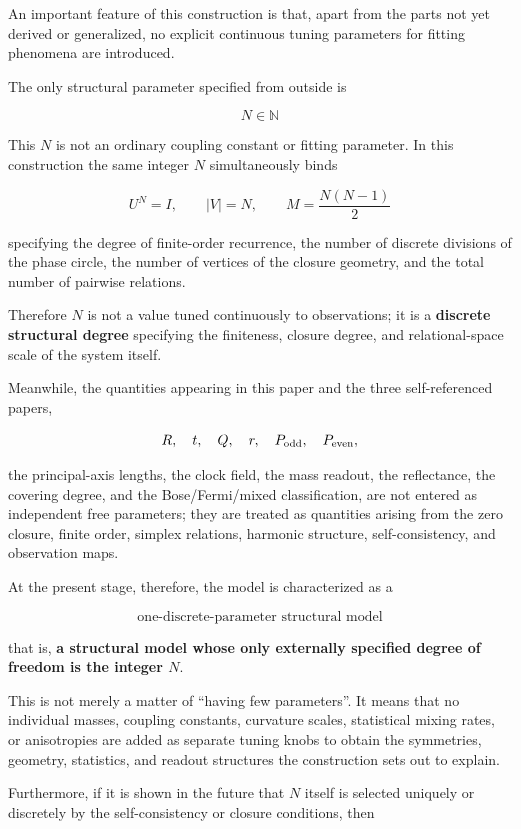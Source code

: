 \documentclass[
  a4paper,
]{article}
\begin{document}
An important feature of this construction is that, apart from the parts
not yet derived or generalized, no explicit continuous tuning parameters
for fitting phenomena are introduced.

The only structural parameter specified from outside is

\[
\boxed{N\in\mathbb N}
\]

This \(N\) is not an ordinary coupling constant or fitting parameter. In
this construction the same integer \(N\) simultaneously binds

\[
\boxed{
U^N=I,\qquad
|V|=N,\qquad
M=\frac{N(N-1)}2
}
\]

specifying the degree of finite-order recurrence, the number of discrete
divisions of the phase circle, the number of vertices of the closure
geometry, and the total number of pairwise relations.

Therefore \(N\) is not a value tuned continuously to observations; it is
a \textbf{discrete structural degree} specifying the finiteness, closure
degree, and relational-space scale of the system itself.

Meanwhile, the quantities appearing in this paper and the three
self-referenced papers,

\[
R,\quad t,\quad Q,\quad
r,\quad
P_{\rm odd},\quad P_{\rm even},
\]

the principal-axis lengths, the clock field, the mass readout, the
reflectance, the covering degree, and the Bose/Fermi/mixed
classification, are not entered as independent free parameters; they are
treated as quantities arising from the zero closure, finite order,
simplex relations, harmonic structure, self-consistency, and observation
maps.

At the present stage, therefore, the model is characterized as a

\[
\boxed{
\text{one-discrete-parameter structural model}
}
\]

that is, \textbf{a structural model whose only externally specified
degree of freedom is the integer \(N\)}.

This is not merely a matter of ``having few parameters''. It means that
no individual masses, coupling constants, curvature scales, statistical
mixing rates, or anisotropies are added as separate tuning knobs to
obtain the symmetries, geometry, statistics, and readout structures the
construction sets out to explain.

Furthermore, if it is shown in the future that \(N\) itself is selected
uniquely or discretely by the self-consistency or closure conditions,
then
\end{document}
